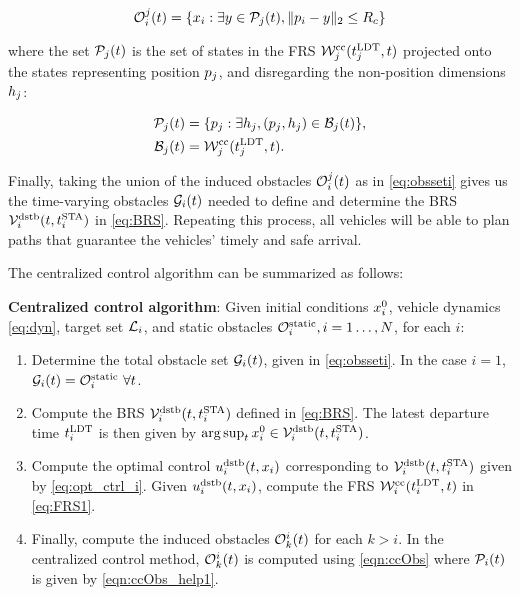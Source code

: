 \begin{equation} \label{eqn:ccObs}
\ioset_i^j(t) = \{\state_i: \exists y \in \pfrs_j(t), \|\pos_i - y\|_2 \le \rc \}
\end{equation}

\noindent where the set $\mathcal{P}_j(t)$ is the set of states in the FRS $\mathcal{W}_j^\text{cc}(t^\text{LDT}_j, t)$ projected onto the states representing position $p_j$, and disregarding the non-position dimensions $h_j$:

\begin{align} 
\pfrs_j(t) & = \{p_j: \exists \npos_j, (p_j, \npos_j) \in \boset_j(t) \}, \label{eqn:ccObs_help1}\\
\boset_j(t) & = \frs_j^\text{cc}(\ldt_j, t). \label{eqn:ccObs_help2}
\end{align}

Finally, taking the union of the induced obstacles $\mathcal{O}_i^j(t)$ as in \eqref{eq:obsseti} gives us the time-varying obstacles $\mathcal{G}_i(t)$ needed to define and determine the BRS $\mathcal{V}_i^\text{dstb}(t, t^\text{STA}_i)$ in \eqref{eq:BRS}. Repeating this process, all vehicles will be able to plan paths that guarantee the vehicles' timely and safe arrival.

The centralized control algorithm can be summarized as follows:
\begin{alg}
\label{alg:cc}
\textbf{Centralized control algorithm}: Given initial conditions $x_i^0$, vehicle dynamics \eqref{eq:dyn}, target set $\mathcal{L}_i$, and static obstacles $\mathcal{O}^\text{static}_i, i = 1\ldots, N$, for each $i$:
\begin{enumerate}
\item Determine the total obstacle set $\mathcal{G}_i(t)$, given in \eqref{eq:obsseti}. In the case $i=1$, $\mathcal{G}_i(t) = \mathcal{O}^\text{static}_i ~ \forall t$.
\item Compute the BRS $\mathcal{V}_i^\text{dstb}(t, t^\text{STA}_i)$ defined in \eqref{eq:BRS}. The latest departure time $t^\text{LDT}_i$ is then given by $\arg \sup_t x^0_i \in \mathcal{V}_i^\text{dstb}(t, t^\text{STA}_i)$.
\item Compute the optimal control $u_i^\text{dstb}(t,x_i)$ corresponding to $\mathcal{V}_i^\text{dstb}(t, t^\text{STA}_i)$ given by \eqref{eq:opt_ctrl_i}. Given $u_i^\text{dstb}(t,x_i)$, compute the FRS $\mathcal{W}_i^\text{cc}(t^\text{LDT}_i, t)$ in \eqref{eq:FRS1}.
\item Finally, compute the induced obstacles $\mathcal{O}_k^i(t)$ for each $k>i$. In the centralized control method, $\mathcal{O}_k^i(t)$ is computed using \eqref{eqn:ccObs} where $\mathcal{P}_i(t)$ is given by \eqref{eqn:ccObs_help1}.
\end{enumerate}
\end{alg}